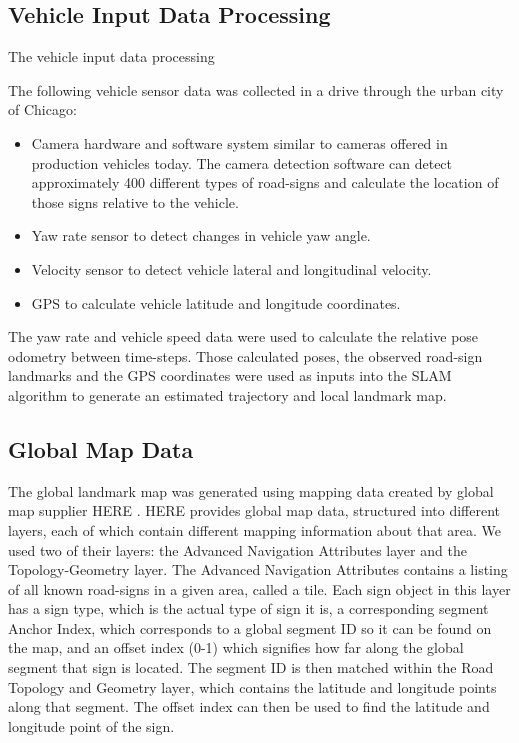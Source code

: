 \documentclass[letterpaper, 10 pt, conference]{ieeeconf}  %
\begin{document}
\subsection{Vehicle Input Data Processing}

The vehicle input data processing

The following vehicle sensor data was collected in a drive through the urban city of Chicago:
\begin{itemize}
\item Camera hardware and software system similar to cameras offered in production vehicles today. The camera detection software can detect approximately 400 different types of road-signs and calculate the location of those signs relative to the vehicle. 
\item Yaw rate sensor to detect changes in vehicle yaw angle.
\item Velocity sensor to detect vehicle lateral and longitudinal velocity.
\item GPS to calculate vehicle latitude and longitude coordinates.
\end{itemize}

The yaw rate and vehicle speed data were used to calculate the relative pose odometry between time-steps. Those calculated poses, the observed road-sign landmarks and the GPS coordinates were used as inputs into the SLAM algorithm to generate an estimated trajectory and local landmark map. 

\subsection{Global Map Data}

The global landmark map was generated using mapping data created by global map supplier HERE \cite{cHERE}. HERE provides global map data, structured into different layers, each of which contain different mapping information about that area. We used two of their layers: the Advanced Navigation Attributes layer and the Topology-Geometry layer. The Advanced Navigation Attributes contains a listing of all known road-signs in a given area, called a tile. Each sign object in this layer has a sign type, which is the actual type of sign it is, a corresponding segment Anchor Index, which corresponds to a global segment ID so it can be found on the map, and an offset index (0-1) which signifies how far along the global segment that sign is located. The segment ID is then matched within the Road Topology and Geometry layer, which contains the latitude and longitude points along that segment. The offset index can then be used to find the latitude and longitude point of the sign.
\end{document}

